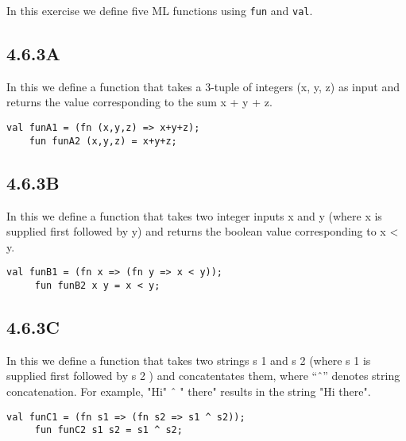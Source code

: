 \documentclass{report}
\begin{document}
  In this exercise we define five ML functions using \texttt{fun} and \texttt{val}.

 \subsection{4.6.3A}
 \label{sec:4.6.3a}

 In this we define a function that takes a 3-tuple of integers (x, y,
z) as input and returns the value corresponding to the sum x + y + z.


  \lstset{frameround=tttt}
   \begin{lstlisting}[frame=tRBL]
    val funA1 = (fn (x,y,z) => x+y+z);
    fun funA2 (x,y,z) = x+y+z;
   \end{lstlisting}

 
 \subsection{4.6.3B}
 \label{sec:4.6.3b}

 In this we define a function that takes two integer inputs x and y
 (where x is supplied first followed by y) and returns the boolean
 value corresponding to x < y.


   \lstset{frameround=tttt}
    \begin{lstlisting}[frame=tRBL]
     val funB1 = (fn x => (fn y => x < y));
     fun funB2 x y = x < y;
    \end{lstlisting}
 
 
 \subsection{4.6.3C}
 \label{sec:4.6.3c}

 In this we define a function that takes two strings s 1 and s 2 (where s 1 is supplied first followed by s 2 ) and concatentates them, where “ˆ” denotes string concatenation. For example, "Hi" ˆ " there" results in the string "Hi there".



   \lstset{frameround=tttt}
    \begin{lstlisting}[frame=tRBL]
     val funC1 = (fn s1 => (fn s2 => s1 ^ s2));
     fun funC2 s1 s2 = s1 ^ s2;
    \end{lstlisting}
\end{document}
